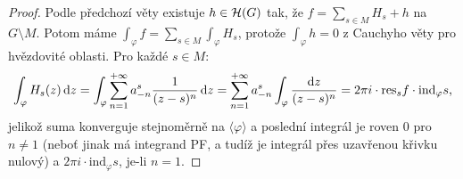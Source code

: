 \begin{proof}
Podle předchozí věty existuje $h \in \operatorname{\mathcal{H}} (G)$ tak, že $f=\sum\limits_{s\in M}H_s+h$ na $G \setminus M$. Potom máme $\int_\varphi f=\sum\limits_{s\in M}\int_\varphi H_s$, protože $\int_\varphi h =0$ z Cauchyho věty pro hvězdovité oblasti. Pro každé $s \in M$:
$$
\int_\varphi H_s(z) \mathop{}\!\mathrm{d} z=\int_\varphi \sum\limits_{n=1}^{+\infty}a_{-n}^s\frac{1}{(z-s)^n} \mathop{}\!\mathrm{d} z = \sum\limits_{n=1}^{+\infty}a_{-n}^s \int_\varphi \frac{\mathop{}\!\mathrm{d} z}{(z-s)^n}=2\pi i \cdot \text{res}_sf\cdot \text{ind}_\varphi s\text{,}
$$
jelikož suma konverguje stejnoměrně na $\langle\varphi \rangle$ a poslední integrál je roven $0$ pro $n \neq 1$ (neboť jinak má integrand PF, a tudíž je integrál přes uzavřenou křivku nulový) a $2 \pi i \cdot \text{ind}_\varphi s$, je-li $n=1$.
\end{proof}
